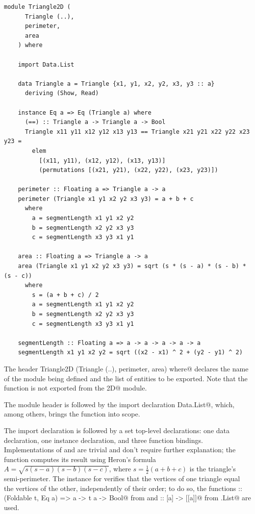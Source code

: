 \documentclass[UdineBachThesis,american,11pt]{PhdThesis}
\begin{document}
  \begin{lstlisting}[gobble=4,basicstyle=\ttfamily\small]
    module Triangle2D (
      Triangle (..),
      perimeter,
      area
    ) where

    import Data.List

    data Triangle a = Triangle {x1, y1, x2, y2, x3, y3 :: a}
      deriving (Show, Read)

    instance Eq a => Eq (Triangle a) where
      (==) :: Triangle a -> Triangle a -> Bool
      Triangle x11 y11 x12 y12 x13 y13 == Triangle x21 y21 x22 y22 x23 y23 =
        elem
          [(x11, y11), (x12, y12), (x13, y13)]
          (permutations [(x21, y21), (x22, y22), (x23, y23)])

    perimeter :: Floating a => Triangle a -> a
    perimeter (Triangle x1 y1 x2 y2 x3 y3) = a + b + c
      where
        a = segmentLength x1 y1 x2 y2
        b = segmentLength x2 y2 x3 y3
        c = segmentLength x3 y3 x1 y1

    area :: Floating a => Triangle a -> a
    area (Triangle x1 y1 x2 y2 x3 y3) = sqrt (s * (s - a) * (s - b) * (s - c))
      where
        s = (a + b + c) / 2
        a = segmentLength x1 y1 x2 y2
        b = segmentLength x2 y2 x3 y3
        c = segmentLength x3 y3 x1 y1

    segmentLength :: Floating a => a -> a -> a -> a -> a
    segmentLength x1 y1 x2 y2 = sqrt ((x2 - x1) ^ 2 + (y2 - y1) ^ 2)
  \end{lstlisting}

  The header
  \lstinline@module Triangle2D (Triangle (..), perimeter, area) where@ declares
  the name of the module being defined and the list of entities to be exported.
  Note that the function \lstinline@segmentLength@ is not exported from the
  \lstinline@Triangle2D@ module.

  The module header is followed by the import declaration
  \lstinline@import Data.List@, which, among others, brings the function
  \lstinline@permutations@ into scope.

  The import declaration is followed by a set top-level declarations: one data
  declaration, one instance declaration, and three function bindings.
  Implementations of \lstinline@perimeter@ and \lstinline@segmentLength@ are
  trivial and don't require further explanation; the \lstinline@area@ function
  computes its result using Heron's formula
  $A = \sqrt{s \left(s - a\right) \left(s - b\right) \left(s - c\right)}$, where
  $s = \frac{1}{2} \left(a + b + c\right)$ is the triangle's semi-perimeter. The
  \lstinline@Eq@ instance for \lstinline@Triangle@ verifies that the vertices of
  one triangle equal the vertices of the other, independently of their order;
  to do so, the functions
  \lstinline@elem :: (Foldable t, Eq a) => a -> t a -> Bool@ from
  \lstinline@Prelude@ and \lstinline@permutations :: [a] -> [[a]]@ from
  \lstinline@Data.List@ are used.
\end{document}
